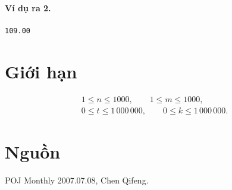 \documentclass[11pt]{article}
\begin{document}
\paragraph{Ví dụ ra 2.}
\begin{verbatim}
109.00
\end{verbatim}

\section{Giới hạn}

\[
\begin{gathered}
1\le n\le 1000,\qquad 1\le m\le 1000,\\
0\le t\le 1\,000\,000,\qquad 0\le k\le 1\,000\,000.
\end{gathered}
\]

\section{Nguồn}

POJ Monthly 2007.07.08, Chen Qifeng.
\end{document}
